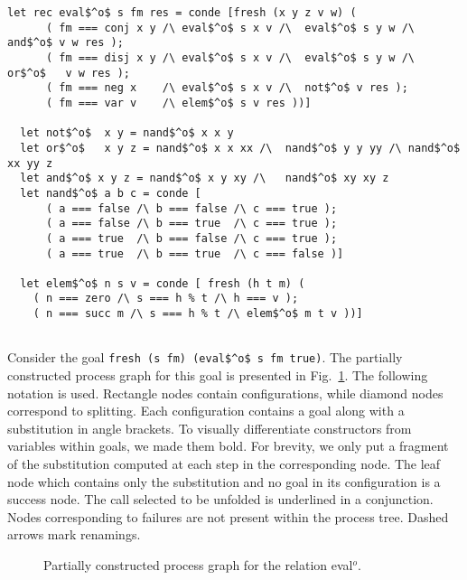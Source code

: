 \begin{figure*}[!t]
  \centering
  \begin{minipage}{0.95\textwidth}
    \begin{lstlisting}[label={eval:whole}, caption={Evaluator of propositional formulas}, captionpos=b, frame=tb]
  let rec eval$^o$ s fm res = conde [fresh (x y z v w) (
      ( fm === conj x y /\ eval$^o$ s x v /\  eval$^o$ s y w /\  and$^o$ v w res );
      ( fm === disj x y /\ eval$^o$ s x v /\  eval$^o$ s y w /\  or$^o$   v w res );
      ( fm === neg x    /\ eval$^o$ s x v /\  not$^o$ v res );
      ( fm === var v    /\ elem$^o$ s v res ))]

  let not$^o$  x y = nand$^o$ x x y
  let or$^o$   x y z = nand$^o$ x x xx /\  nand$^o$ y y yy /\ nand$^o$ xx yy z
  let and$^o$ x y z = nand$^o$ x y xy /\   nand$^o$ xy xy z
  let nand$^o$ a b c = conde [
      ( a === false /\ b === false /\ c === true );
      ( a === false /\ b === true  /\ c === true );
      ( a === true  /\ b === false /\ c === true );
      ( a === true  /\ b === true  /\ c === false )]

  let elem$^o$ n s v = conde [ fresh (h t m) (
    ( n === zero /\ s === h % t /\ h === v );
    ( n === succ m /\ s === h % t /\ elem$^o$ m t v ))]


    \end{lstlisting}
  \end{minipage}
\end{figure*}

Consider the goal \lstinline{fresh (s fm) (eval$^o$ s fm true)}.
The partially constructed process graph for this goal is presented in Fig.~\ref{fig:evalTree}.
The following notation is used.
Rectangle nodes contain configurations, while diamond nodes correspond to splitting.
Each configuration contains a goal along with a substitution in angle brackets.
To visually differentiate constructors from variables within goals, we made them bold.
For brevity, we only put a fragment of the substitution computed at each step in the corresponding node.
The leaf node which contains only the substitution and no goal in its configuration is a success node.
The call selected to be unfolded is underlined in a conjunction.
Nodes corresponding to failures are not present within the process tree.
Dashed arrows mark renamings.

\begin{figure}[!t]
  \centering
  \begin{minipage}{0.95\textwidth}
    
  \end{minipage}
  \caption{Partially constructed process graph for the relation eval$^o$.}
  \label{fig:evalTree}
\end{figure}



